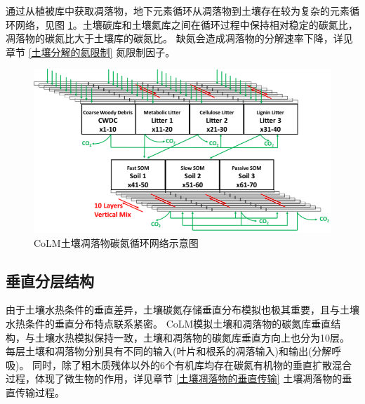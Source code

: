 通过从植被库中获取凋落物，地下元素循环从凋落物到土壤存在较为复杂的元素循环网络，见图 \ref{fig:CoLM土壤凋落物碳氮循环网络示意图}。土壤碳库和土壤氮库之间在循环过程中保持相对稳定的碳氮比，凋落物的碳氮比大于土壤库的碳氮比。
缺氮会造成凋落物的分解速率下降，详见章节 \ref{土壤分解的氮限制} 氮限制因子。
{
  \begin{figure}[htbp]
    \centering
    \includegraphics{Figures/碳氮库结构/CoLM土壤凋落物碳氮循环网络示意图.png}
    \caption[CoLM土壤凋落物碳氮循环网络示意图]{CoLM土壤凋落物碳氮循环网络示意图 \citep{huang2018matrix}  }
    \label{fig:CoLM土壤凋落物碳氮循环网络示意图}
  \end{figure}
}
\subsection{垂直分层结构}\label{垂直分层结构}
由于土壤水热条件的垂直差异，土壤碳氮存储垂直分布模拟也极其重要，且与土壤水热条件的垂直分布特点联系紧密。
CoLM模拟土壤和凋落物的碳氮库垂直结构，与土壤水热模拟保持一致，土壤和凋落物的碳氮库垂直方向上也分为10层。
每层土壤和凋落物分别具有不同的输入(叶片和根系的凋落输入)和输出(分解呼吸)。
同时，除了粗木质残体以外的6个有机库均存在碳氮有机物的垂直扩散混合过程，体现了微生物的作用，详见章节 \ref{土壤凋落物的垂直传输} 土壤凋落物的垂直传输过程。
